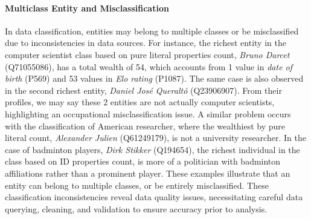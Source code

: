 \paragraph{Multiclass Entity and Misclassification}
In data classification, entities may belong to multiple classes or be misclassified due to inconsistencies in data sources. For instance, the richest entity in the computer scientist class based on pure literal properties count, \textit{Bruno Darcet} (Q71055086), has a total wealth of 54, which accounts from 1 value in \textit{date of birth} (P569) and 53 values in \textit{Elo rating} (P1087). The same case is also observed in the second richest entity, \textit{Daniel José Queraltó} (Q23906907). From their profiles, we may say these 2 entities are not actually computer scientists, highlighting an occupational misclassification issue. A similar problem occurs with the classification of American researcher, where the wealthiest by pure literal count, \textit{Alexander Julien} (Q61249179), is not a university researcher. In the case of badminton players, \textit{Dirk Stikker} (Q194654), the richest individual in the class based on ID properties count, is more of a politician with badminton affiliations rather than a prominent player. These examples illustrate that an entity can belong to multiple classes, or be entirely misclassified. These classification inconsistencies reveal data quality issues, necessitating careful data querying, cleaning, and validation to ensure accuracy prior to analysis.
